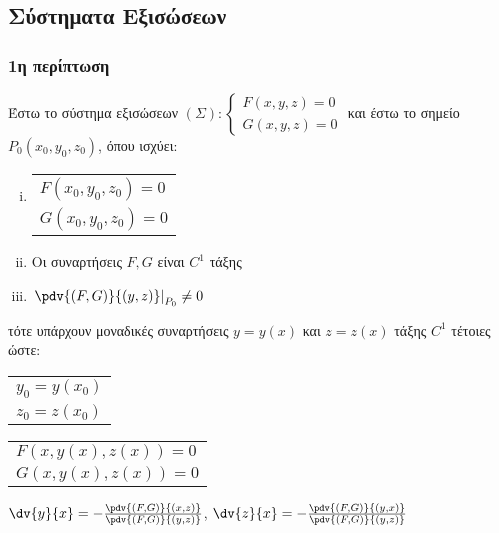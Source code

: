     \subsection{Σύστηματα Εξισώσεων}

    \subsubsection{1η περίπτωση}

    Έστω το σύστημα εξισώσεων $(\Sigma):
    \begin{cases}
      F(x,y,z) = 0  \\
      G(x,y,z) = 0
    \end{cases}$
    και έστω το σημείο $ P_0(x_0,y_0,z_0) $, όπου ισχύει:
    \begin{enumerate}[(i)]
      \item  \begin{tabular}{l}
          $F(x_0,y_0,z_0) = 0$ \\
          $G(x_0,y_0,z_0) = 0$
        \end{tabular}
      \item Οι συναρτήσεις $ F, G $ είναι $ C^{1} $ τάξης 
      \item $ 
        \left. \pdv{(F,G)}{(y,z)} \right| _{P_0} \neq 0 $ 
      \end{enumerate} 
      τότε υπάρχουν μοναδικές συναρτήσεις $ y = y(x) $ και $ z = z(x) $ τάξης $ C^{1} $ 
      τέτοιες ώστε:
      \begin{myitemize}
        \item 
          \begin{tabular}{l}
            $ y_0 = y(x_0) $ \\
            $ z_0 = z(x_0) $
          \end{tabular}
        \item 
          \begin{tabular}{l}
            $ F(x,y(x),z(x)) = 0 $ \\
            $ G(x,y(x),z(x)) = 0 $
          \end{tabular}
        \item $ \dv{y}{x} = - \frac{\pdv{(F,G)}{(x,z)}}{\pdv{(F,G)}{(y,z)}} $, 
          $ \dv{z}{x} = - \frac{\pdv{(F,G)}{(y,x)}}{\pdv{(F,G)}{(y,z)}} $
      \end{myitemize}

